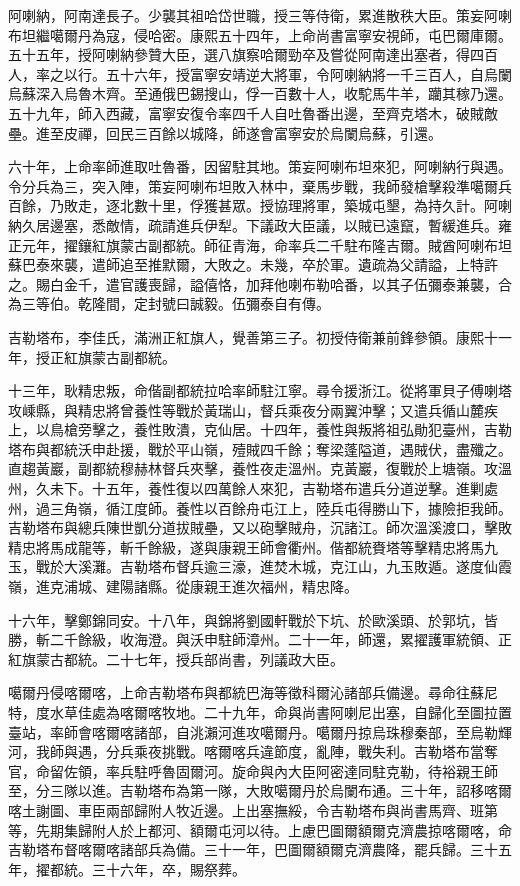 \begin{pinyinscope}
阿喇納，阿南達長子。少襲其祖哈岱世職，授三等侍衛，累進散秩大臣。策妄阿喇布坦繼噶爾丹為寇，侵哈密。康熙五十四年，上命尚書富寧安視師，屯巴爾庫爾。五十五年，授阿喇納參贊大臣，選八旗察哈爾勁卒及嘗從阿南達出塞者，得四百人，率之以行。五十六年，授富寧安靖逆大將軍，令阿喇納將一千三百人，自烏闌烏蘇深入烏魯木齊。至通俄巴錫搜山，俘一百數十人，收駝馬牛羊，躪其稼乃還。五十九年，師入西藏，富寧安復令率四千人自吐魯番出邊，至齊克塔木，破賊敵壘。進至皮禪，回民三百餘以城降，師遂會富寧安於烏闌烏蘇，引還。

六十年，上命率師進取吐魯番，因留駐其地。策妄阿喇布坦來犯，阿喇納行與遇。令分兵為三，突入陣，策妄阿喇布坦敗入林中，棄馬步戰，我師發槍擊殺準噶爾兵百餘，乃敗走，逐北數十里，俘獲甚眾。授協理將軍，築城屯墾，為持久計。阿喇納久居邊塞，悉敵情，疏請進兵伊犁。下議政大臣議，以賊已遠竄，暫緩進兵。雍正元年，擢鑲紅旗蒙古副都統。師征青海，命率兵二千駐布隆吉爾。賊酋阿喇布坦蘇巴泰來襲，遣師追至推默爾，大敗之。未幾，卒於軍。遺疏為父請謚，上特許之。賜白金千，遣官護喪歸，謚僖恪，加拜他喇布勒哈番，以其子伍彌泰兼襲，合為三等伯。乾隆間，定封號曰誠毅。伍彌泰自有傳。

吉勒塔布，李佳氏，滿洲正紅旗人，覺善第三子。初授侍衛兼前鋒參領。康熙十一年，授正紅旗蒙古副都統。

十三年，耿精忠叛，命偕副都統拉哈率師駐江寧。尋令援浙江。從將軍貝子傅喇塔攻嵊縣，與精忠將曾養性等戰於黃瑞山，督兵乘夜分兩翼沖擊；又遣兵循山麓疾上，以鳥槍旁擊之，養性敗潰，克仙居。十四年，養性與叛將祖弘勛犯臺州，吉勒塔布與都統沃申赴援，戰於平山嶺，殪賊四千餘；奪梁蓬隘道，遇賊伏，盡殲之。直趨黃巖，副都統穆赫林督兵夾擊，養性夜走溫州。克黃巖，復戰於上塘嶺。攻溫州，久未下。十五年，養性復以四萬餘人來犯，吉勒塔布遣兵分道逆擊。進剿處州，過三角嶺，循江度師。養性以百餘舟屯江上，陸兵屯得勝山下，據險拒我師。吉勒塔布與總兵陳世凱分道拔賊壘，又以砲擊賊舟，沉諸江。師次溫溪渡口，擊敗精忠將馬成龍等，斬千餘級，遂與康親王師會衢州。偕都統賚塔等擊精忠將馬九玉，戰於大溪灘。吉勒塔布督兵逾三濠，進焚木城，克江山，九玉敗遁。遂度仙霞嶺，進克浦城、建陽諸縣。從康親王進次福州，精忠降。

十六年，擊鄭錦同安。十八年，與錦將劉國軒戰於下坑、於歐溪頭、於郭坑，皆勝，斬二千餘級，收海澄。與沃申駐師漳州。二十一年，師還，累擢護軍統領、正紅旗蒙古都統。二十七年，授兵部尚書，列議政大臣。

噶爾丹侵喀爾喀，上命吉勒塔布與都統巴海等徵科爾沁諸部兵備邊。尋命往蘇尼特，度水草佳處為喀爾喀牧地。二十九年，命與尚書阿喇尼出塞，自歸化至圖拉置臺站，率師會喀爾喀諸部，自洮瀨河進攻噶爾丹。噶爾丹掠烏珠穆秦部，至烏勒輝河，我師與遇，分兵乘夜挑戰。喀爾喀兵違節度，亂陣，戰失利。吉勒塔布當奪官，命留佐領，率兵駐呼魯固爾河。旋命與內大臣阿密達同駐克勒，待裕親王師至，分三隊以進。吉勒塔布為第一隊，大敗噶爾丹於烏闌布通。三十年，詔移喀爾喀土謝圖、車臣兩部歸附人牧近邊。上出塞撫綏，令吉勒塔布與尚書馬齊、班第等，先期集歸附人於上都河、額爾屯河以待。上慮巴圖爾額爾克濟農掠喀爾喀，命吉勒塔布督喀爾喀諸部兵為備。三十一年，巴圖爾額爾克濟農降，罷兵歸。三十五年，擢都統。三十六年，卒，賜祭葬。


\end{pinyinscope}
